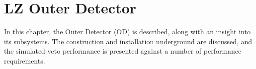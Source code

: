 \chapter{LZ Outer Detector}
\label{chapter:lz_outer_detector}
\par
In this chapter, the Outer Detector (OD) is described, along with an insight into its subsystems.
The construction and installation underground are discussed, and the simulated veto performance is presented against a number of performance requirements.




\clearpage

\clearpage
